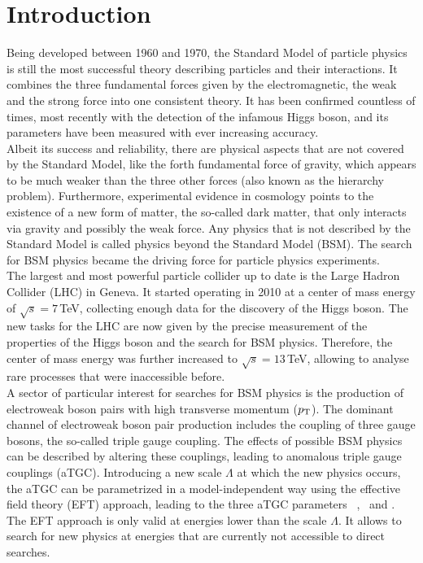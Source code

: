 \chapter*{Introduction}
Being developed between 1960 and 1970, the Standard Model of particle physics is still the most successful theory describing particles and their interactions. It combines the three fundamental forces given by the electromagnetic, the weak and the strong force into one consistent theory. It has been confirmed countless of times, most recently with the detection of the infamous Higgs boson, and its parameters have been measured with ever increasing accuracy.\\

Albeit its success and reliability, there are physical aspects that are not covered by the Standard Model, like the forth fundamental force of gravity, which appears to be much weaker than the three other forces (also known as the hierarchy problem). Furthermore, experimental evidence in cosmology points to the existence of a new form of matter, the so-called dark matter, that only interacts via gravity and possibly the weak force. Any physics that is not described by the Standard Model is called physics beyond the Standard Model (BSM). The search for BSM physics became the driving force for particle physics experiments.\\

The largest and most powerful particle collider up to date is the Large Hadron Collider (LHC) in Geneva. It started operating in 2010 at a center of mass energy of $\sqrt{s}=7$\,TeV, collecting enough data for the discovery of the Higgs boson. The new tasks for the LHC are now given by the precise measurement of the properties of the Higgs boson and the search for BSM physics. Therefore, the center of mass energy was further increased to $\sqrt{s}=13$\,TeV, allowing to analyse rare processes that were inaccessible before.\\

A sector of particular interest for searches for BSM physics is the production of electroweak boson pairs with high transverse momentum ($p_{\rm T}$). The dominant channel of electroweak boson pair production includes the coupling of three gauge bosons, the so-called triple gauge coupling. The effects of possible BSM physics can be described by altering these couplings, leading to anomalous triple gauge couplings (aTGC). Introducing a new scale $\Lambda$ at which the new physics occurs, the aTGC can be parametrized in a model-independent way using the effective field theory (EFT) approach, leading to the three aTGC parameters \Tcwww \ , \Tccw \ and \Tcb . The EFT approach is only valid at energies lower than the scale $\Lambda$. It allows to search for new physics at energies that are currently not accessible to direct searches.\\

